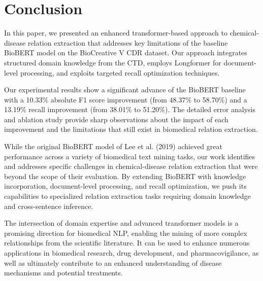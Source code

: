 \documentclass{amia}
\begin{document}
\section*{Conclusion}

In this paper, we presented an enhanced transformer-based approach to chemical-disease relation extraction that addresses key limitations of the baseline BioBERT model on the BioCreative V CDR dataset. Our approach integrates structured domain knowledge from the CTD, employs Longformer for document-level processing, and exploits targeted recall optimization techniques.

Our experimental results show a significant advance of the BioBERT baseline with a 10.33\% absolute F1 score improvement (from 48.37\% to 58.70\%) and a 13.19\% recall improvement (from 38.01\% to 51.20\%). The detailed error analysis and ablation study provide sharp observations about the impact of each improvement and the limitations that still exist in biomedical relation extraction.

While the original BioBERT model of Lee et al. (2019) achieved great performance across a variety of biomedical text mining tasks, our work identifies and addresses specific challenges in chemical-disease relation extraction that were beyond the scope of their evaluation. By extending BioBERT with knowledge incorporation, document-level processing, and recall optimization, we push its capabilities to specialized relation extraction tasks requiring domain knowledge and cross-sentence inference.

The intersection of domain expertise and advanced transformer models is a promising direction for biomedical NLP, enabling the mining of more complex relationships from the scientific literature. It can be used to enhance numerous applications in biomedical research, drug development, and pharmacovigilance, as well as ultimately contribute to an enhanced understanding of disease mechanisms and potential treatments.

\makeatletter
\renewcommand{\@biblabel}[1]{\hfill #1.}
\makeatother
\end{document}
